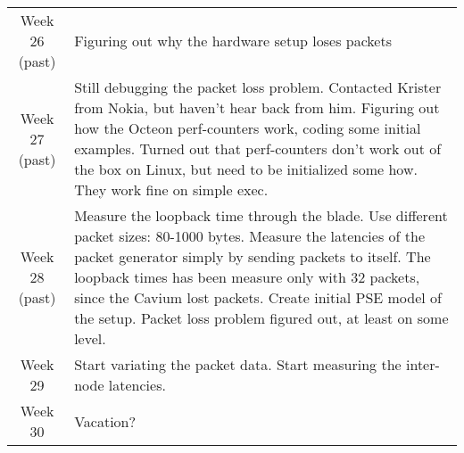 \begin{table}[h]
  \centering
  \begin{tabular}{@{}c|p{10cm}@{}}
    \toprule
    Week 26 (past) & Figuring out why the hardware setup loses packets \\
    Week 27 (past) & Still debugging the packet loss problem. Contacted Krister from Nokia, but haven't hear back from him. Figuring out how the Octeon perf-counters work, coding some initial examples. Turned out that perf-counters don't work out of the box on Linux, but need to be initialized some how. They work fine on simple exec.\\
    Week 28 (past) & Measure the loopback time through the blade. Use different packet sizes: 80-1000 bytes. Measure the latencies of the packet generator simply by sending packets to itself. The loopback times has been measure only with 32 packets, since the Cavium lost packets. Create initial PSE model of the setup. Packet loss problem figured out, at least on some level. \\
    Week 29 & Start variating the packet data. Start measuring the inter-node latencies. \\
    Week 30 & Vacation? \\
    \bottomrule
  \end{tabular}
\end{table}

